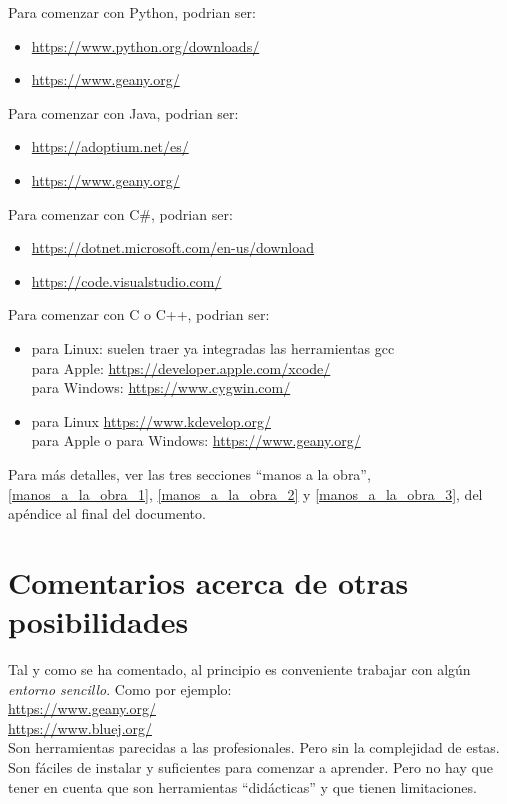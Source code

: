 \documentclass[spanish,12pt,a4paper,final,oneside]{book}
\begin{document}
Para comenzar con Python, podrian ser:
\begin{itemize}
\item \url{https://www.python.org/downloads/}
\item \url{https://www.geany.org/}
\end{itemize}

Para comenzar con Java, podrian ser:
\begin{itemize}
\item \url{https://adoptium.net/es/}
\item \url{https://www.geany.org/}
\end{itemize}

Para comenzar con C\#, podrian ser:
\begin{itemize}
\item \url{https://dotnet.microsoft.com/en-us/download}
\item \url{https://code.visualstudio.com/}
\end{itemize}

Para comenzar con C o C++, podrian ser:
\begin{itemize}
\item para Linux: suelen traer ya integradas las herramientas gcc
\\para Apple: \url{https://developer.apple.com/xcode/}
\\para Windows: \url{https://www.cygwin.com/}
\item para Linux \url{https://www.kdevelop.org/}
\\para Apple o para Windows: \url{https://www.geany.org/}
\end{itemize}

Para más detalles, ver las tres secciones ``manos a la obra'', \ref{manos_a_la_obra_1}, \ref{manos_a_la_obra_2} y \ref{manos_a_la_obra_3}, del apéndice al final del documento. 


\section{Comentarios acerca de otras posibilidades}
Tal y como se ha comentado, al principio es conveniente trabajar con algún \textit{entorno sencillo}. Como por ejemplo:
\\ \url{https://www.geany.org/}
\\ \url{https://www.bluej.org/}
\\Son herramientas parecidas a las  profesionales. Pero sin la complejidad de estas.
\\Son fáciles de instalar y suficientes para comenzar a aprender. Pero no hay que tener en cuenta que son herramientas ``didácticas'' y que tienen limitaciones.
\end{document}
